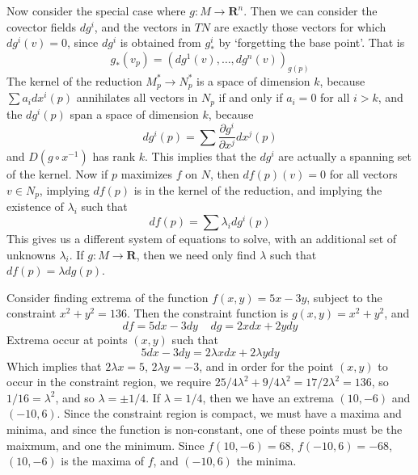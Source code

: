 Now consider the special case where $g: M \to \mathbf{R}^n$. Then we can consider the covector fields $dg^i$, and the vectors in $TN$ are exactly those vectors for which $dg^i(v) = 0$, since $dg^i$ is obtained from $g^i_*$ by `forgetting the base point'. That is
%
\[ g_*(v_p) = (dg^1(v), \dots, dg^n(v))_{g(p)} \]
%
The kernel of the reduction $M^*_p \to N^*_p$ is a space of dimension $k$, because $\sum a_i dx^i(p)$ annihilates all vectors in $N_p$ if and only if $a_i = 0$ for all $i > k$, and the $dg^i(p)$ span a space of dimension $k$, because
%
\[ dg^i(p) = \sum \frac{\partial g^i}{\partial x^j} dx^j(p) \]
%
and $D(g \circ x^{-1})$ has rank $k$. This implies that the $dg^i$ are actually a spanning set of the kernel. Now if $p$ maximizes $f$ on $N$, then $df(p)(v) = 0$ for all vectors $v \in N_p$, implying $df(p)$ is in the kernel of the reduction, and implying the existence of $\lambda_i$ such that
%
\[ df(p) = \sum \lambda_i dg^i(p) \]
%
This gives us a different system of equations to solve, with an additional set of unknowns $\lambda_i$. If $g: M \to \mathbf{R}$, then we need only find $\lambda$ such that $df(p) = \lambda dg(p)$.

\begin{example}
    Consider finding extrema of the function $f(x,y) = 5x - 3y$, subject to the constraint $x^2 + y^2 = 136$. Then the constraint function is $g(x,y) = x^2 + y^2$, and
    \[ df = 5dx - 3dy\ \ \ \ \ dg = 2x dx + 2y dy \]
    Extrema occur at points $(x,y)$ such that
    \[ 5dx - 3dy = 2 \lambda x dx + 2 \lambda y dy \]
    Which implies that $2 \lambda x = 5$, $2 \lambda y = -3$, and in order for the point $(x,y)$ to occur in the constraint region, we require $25/4 \lambda^2 + 9/4 \lambda^2 = 17/2\lambda^2 = 136$, so $1/16 = \lambda^2$, and so $\lambda = \pm 1/4$. If $\lambda = 1/4$, then we have an extrema $(10, -6)$ and $(-10, 6)$. Since the constraint region is compact, we must have a maxima and minima, and since the function is non-constant, one of these points must be the maixmum, and one the minimum. Since $f(10,-6) = 68$, $f(-10,6) = -68$, $(10,-6)$ is the maxima of $f$, and $(-10,6)$ the minima.
\end{example}

